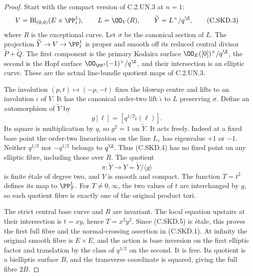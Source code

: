 \begin{proof}
Start with the compact version of C.2.UN.3 at $n=1$:
\[
 V=\operatorname{Bl}_{(0,0)}(E\times\PP^1_t),\qquad
 L=\OO_V(R),\qquad
 \widetilde Y=L^\times/q^{\Z},
                                                            \tag{C.SKD.3}
\]
where $R$ is the exceptional curve. Let $\sigma$ be
the canonical section of $L$. The projection
$\widetilde Y\to V\to\PP^1_t$ is proper and smooth
off its reduced central divisor
$\widetilde P+\widetilde Q$. The first component is
the primary Kodaira surface
$\OO_E([0])^\times/q^{\Z}$, the second is the Hopf
surface $\OO_{\PP^1}(-1)^\times/q^{\Z}$, and their
intersection is an elliptic curve. These are the
actual line-bundle quotient maps of C.2.UN.3.

The involution $(p,t)\mapsto(-p,-t)$ fixes the blowup
centre and lifts to an involution $\iota$ of $V$.
It has the canonical order-two lift $\widehat\iota$
to $L$ preserving $\sigma$. Define an automorphism
of $\widetilde Y$ by
\[
             g[\ell]=[q^{1/2}\widehat\iota(\ell)].
                                                            \tag{C.SKD.4}
\]
Its square is multiplication by $q$, so $g^2=1$
on $\widetilde Y$. It acts freely. Indeed at a
fixed base point the order-two linearization on
the line $L_v$ has eigenvalue $+1$ or $-1$.
Neither $q^{1/2}$ nor $-q^{1/2}$ belongs to
$q^{\Z}$. Thus (C.SKD.4) has no fixed point on
any elliptic fibre, including those over $R$.
The quotient
\[
              \pi:\widetilde Y\longrightarrow Y
                        =\widetilde Y/\langle g\rangle
                                                            \tag{C.SKD.5}
\]
is finite \'etale of degree two, and $Y$ is smooth
and compact. The function $T=t^2$ defines its map
to $\PP^1_T$. For $T\ne0,\infty$, the two values
of $t$ are interchanged by $g$, so each quotient
fibre is exactly one of the original product
tori.

The strict central base curve and $R$ are
invariant. The local equation upstairs at their
intersection is $t=xy$, hence $T=x^2y^2$.
Since (C.SKD.5) is \'etale, this proves the first
full fibre and the normal-crossing assertion
in (C.SKD.1). At infinity the original smooth
fibre is $E\times E$, and the action is base
inversion on the first elliptic factor and
translation by the class of $q^{1/2}$ on the
second. It is free. Its quotient is a
bielliptic surface $B$, and the transverse
coordinate is squared, giving the full fibre
$2B$.


\end{proof}
